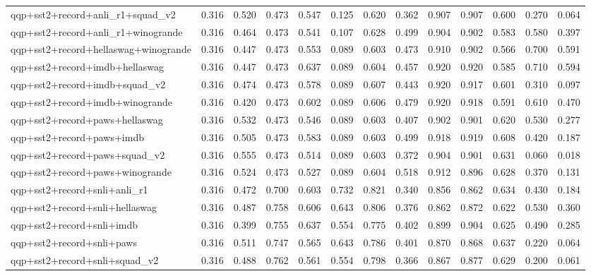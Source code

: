 \begin{table}[t]
\begin{tabular}{lrrrrrrrrrrrr}
    qqp+sst2+record+anli\_r1+squad\_v2 & 0.316 & 0.520 & 0.473 & 0.547 & 0.125 & 0.620 & 0.362 & 0.907 & 0.907 & 0.600 & 0.270 & 0.064 \\
    qqp+sst2+record+anli\_r1+winogrande & 0.316 & 0.464 & 0.473 & 0.541 & 0.107 & 0.628 & 0.499 & 0.904 & 0.902 & 0.583 & 0.580 & 0.397 \\
    qqp+sst2+record+hellaswag+winogrande & 0.316 & 0.447 & 0.473 & 0.553 & 0.089 & 0.603 & 0.473 & 0.910 & 0.902 & 0.566 & 0.700 & 0.591 \\
    qqp+sst2+record+imdb+hellaswag & 0.316 & 0.447 & 0.473 & 0.637 & 0.089 & 0.604 & 0.457 & 0.920 & 0.920 & 0.585 & 0.710 & 0.594 \\
    qqp+sst2+record+imdb+squad\_v2 & 0.316 & 0.474 & 0.473 & 0.578 & 0.089 & 0.607 & 0.443 & 0.920 & 0.917 & 0.601 & 0.310 & 0.097 \\
    qqp+sst2+record+imdb+winogrande & 0.316 & 0.420 & 0.473 & 0.602 & 0.089 & 0.606 & 0.479 & 0.920 & 0.918 & 0.591 & 0.610 & 0.470 \\
    qqp+sst2+record+paws+hellaswag & 0.316 & 0.532 & 0.473 & 0.546 & 0.089 & 0.603 & 0.407 & 0.902 & 0.901 & 0.620 & 0.530 & 0.277 \\
    qqp+sst2+record+paws+imdb & 0.316 & 0.505 & 0.473 & 0.583 & 0.089 & 0.603 & 0.499 & 0.918 & 0.919 & 0.608 & 0.420 & 0.187 \\
    qqp+sst2+record+paws+squad\_v2 & 0.316 & 0.555 & 0.473 & 0.514 & 0.089 & 0.603 & 0.372 & 0.904 & 0.901 & 0.631 & 0.060 & 0.018 \\
    qqp+sst2+record+paws+winogrande & 0.316 & 0.524 & 0.473 & 0.527 & 0.089 & 0.604 & 0.518 & 0.912 & 0.896 & 0.628 & 0.370 & 0.131 \\
    qqp+sst2+record+snli+anli\_r1 & 0.316 & 0.472 & 0.700 & 0.603 & 0.732 & 0.821 & 0.340 & 0.856 & 0.862 & 0.634 & 0.430 & 0.184 \\
    qqp+sst2+record+snli+hellaswag & 0.316 & 0.487 & 0.758 & 0.606 & 0.643 & 0.806 & 0.376 & 0.862 & 0.872 & 0.622 & 0.530 & 0.360 \\
    qqp+sst2+record+snli+imdb & 0.316 & 0.399 & 0.755 & 0.637 & 0.554 & 0.775 & 0.402 & 0.899 & 0.904 & 0.625 & 0.490 & 0.285 \\
    qqp+sst2+record+snli+paws & 0.316 & 0.511 & 0.747 & 0.565 & 0.643 & 0.786 & 0.401 & 0.870 & 0.868 & 0.637 & 0.220 & 0.064 \\
    qqp+sst2+record+snli+squad\_v2 & 0.316 & 0.488 & 0.762 & 0.561 & 0.554 & 0.798 & 0.366 & 0.867 & 0.877 & 0.629 & 0.200 & 0.061 \\

\end{tabular}
\end{table}
